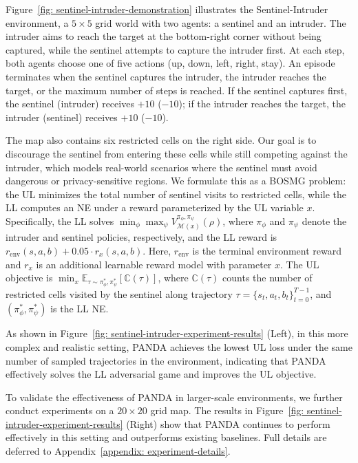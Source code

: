 \documentclass{article}
\theoremstyle{plain}
\theoremstyle{definition}
\theoremstyle{remark}
\def\E{\mathbb E}
\def\cM{\mathcal M}
\begin{document}
Figure~\ref{fig: sentinel-intruder-demonstration} illustrates the Sentinel-Intruder environment, a $5\times 5$ grid world with two agents: a sentinel and an intruder. The intruder aims to reach the target at the bottom-right corner without being
captured, while the sentinel attempts to capture the intruder first. At each step, both agents choose one of five actions (up, down, left, right, stay). An episode terminates when the sentinel captures the intruder, the intruder reaches the target, or the maximum number of steps is reached. If the sentinel captures first, the sentinel (intruder) receives $+10$ ($-10$); if the intruder reaches the target, the intruder (sentinel) receives $+10$ ($-10$).

The map also contains six restricted cells on the right side. Our goal is to discourage the sentinel from entering these cells while still competing against the intruder, which models real-world scenarios where the sentinel must avoid dangerous or
privacy-sensitive regions. We formulate this as a BOSMG problem: the UL minimizes the total number of sentinel visits to restricted cells, while the LL computes an NE under a reward parameterized by the UL variable $x$. Specifically, the LL solves $\min_\phi \max_\psi V^{\pi_\phi,\pi_\psi}_{\cM(x)}(\rho)$, where $\pi_\phi$ and $\pi_\psi$ denote the intruder and sentinel policies, respectively, and the LL reward is $r_{\text{env}}(s,a,b) + 0.05\cdot r_x(s,a,b)$. Here, $r_{\text{env}}$ is the terminal environment reward and $r_x$ is an additional learnable reward model with parameter $x$. The UL objective is $\min_x \E_{\tau \sim \pi_{\phi}^*,\pi_{\psi}^*}\!\left[\mathbb{C}(\tau)\right]$, where $\mathbb{C}(\tau)$ counts the number of restricted cells visited by the sentinel along trajectory $\tau=\{s_t,a_t,b_t\}_{t=0}^{T-1}$, and $(\pi_{\phi}^*,\pi_{\psi}^*)$ is the LL NE. 

As shown in Figure~\ref{fig: sentinel-intruder-experiment-results} (Left), in this more complex and realistic setting, PANDA achieves the lowest UL loss under the same number of sampled trajectories in the environment, indicating that PANDA effectively solves the LL adversarial game and improves the UL objective.

To validate the effectiveness of PANDA in larger-scale environments, we further conduct experiments on a $20\times20$ grid map. 
The results in Figure~\ref{fig: sentinel-intruder-experiment-results} (Right) show that PANDA continues to perform effectively in this setting and outperforms existing baselines. Full details are deferred to Appendix~\ref{appendix: experiment-details}.
\end{document}
